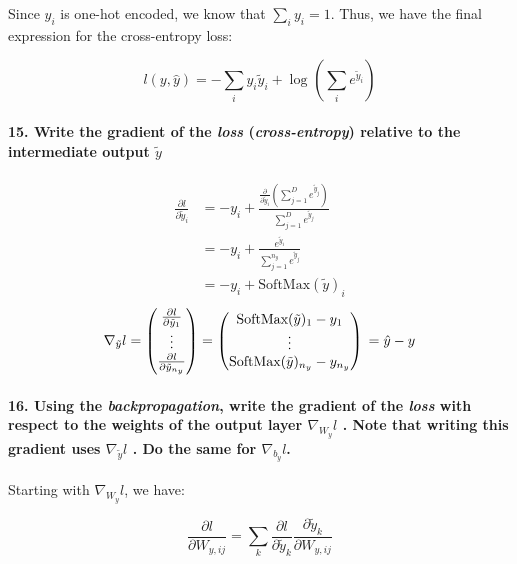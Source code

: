 Since $y_i$ is one-hot encoded, we know that $\sum_i y_i = 1$. Thus, we have the final expression for the cross-entropy loss:

\[ l(y, \hat{y}) = - \sum_{i}^{} y_i \tilde{y}_i + \log_{} \left(\sum_{i}^{} e^{\tilde{y}_i}\right) \]

\paragraph{15. Write the gradient of the \textit{loss} (\textit{cross-entropy}) relative to the intermediate output $ \tilde{y} $ }
\begin{align*}
    \frac{\partial l}{\partial \tilde{y}_i} & = -y_i + \frac{\frac{\partial }{\partial \tilde{y}_i } (\sum_{j=1}^{D} e^{ \tilde{y}_j })}{\sum_{j=1}^{D} e^{ \tilde{y}_j }} \\
                                            & = - y_i + \frac{e^{\tilde{y}_i}}{\sum_{j=1}^{n_y} e^{ \tilde{y}_j}}                                                          \\
                                            & = - y_i + \text{SoftMax}(\tilde{y})_i
\end{align*}
\[
    \nabla _{\tilde{y}}l = \begin{pmatrix}
        \frac{\partial l}{\partial \tilde{y}_1} \\
        \vdots                                  \\
        \frac{\partial l}{\partial \tilde{y}_{n_y}}
    \end{pmatrix} = \begin{pmatrix}
        \text{SoftMax}(\tilde{y})_1 - y_1 \\
        \vdots                            \\
        \text{SoftMax}(\tilde{y})_{n_y} - y_{n_y}
    \end{pmatrix} \\
    = \hat{y} - y
\]

\paragraph{16. Using the \textit{backpropagation}, write the gradient of the \textit{loss} with respect to the weights of the output layer $ \nabla _{W_y}l $ . Note that writing this gradient uses $ \nabla _{\tilde{y}}l $ . Do the same for $ \nabla _{b_y}l $.}

Starting with \( \nabla _{W_y} l \), we have:

\[
    \frac{\partial l}{\partial W_{y,ij}} = \sum_{k}^{} \frac{\partial l}{\partial \tilde{y}_k} \frac{\partial \tilde{y}_k}{\partial W_{y,ij}}
\]

